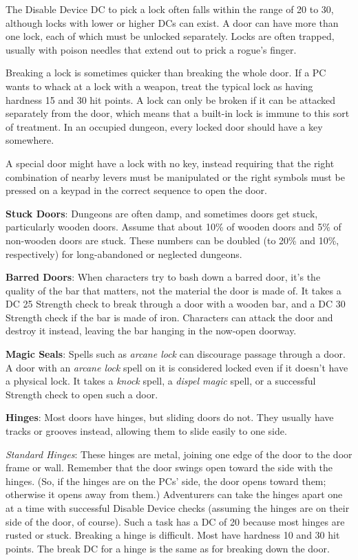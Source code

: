 The Disable Device DC to pick a lock often falls within the range of 20 to 30, although locks with lower or higher DCs can exist. A door can have more than one lock, each of which must be unlocked separately. Locks are often trapped, usually with poison needles that extend out to prick a rogue's finger.
				
Breaking a lock is sometimes quicker than breaking the whole door. If a PC wants to whack at a lock with a weapon, treat the typical lock as having hardness 15 and 30 hit points. A lock can only be broken if it can be attacked separately from the door, which means that a built-in lock is immune to this sort of treatment. In an occupied dungeon, every locked door should have a key somewhere. 
				
A special door might have a lock with no key, instead requiring that the right combination of nearby levers must be manipulated or the right symbols must be pressed on a keypad in the correct sequence to open the door.
				
\textbf{Stuck Doors}: Dungeons are often damp, and sometimes doors get stuck, particularly wooden doors. Assume that about 10\% of wooden doors and 5\% of non-wooden doors are stuck. These numbers can be doubled (to 20\% and 10\%, respectively) for long-abandoned or neglected dungeons.
				
\textbf{Barred Doors}: When characters try to bash down a barred door, it's the quality of the bar that matters, not the material the door is made of. It takes a DC 25 Strength check to break through a door with a wooden bar, and a DC 30 Strength check if the bar is made of iron. Characters can attack the door and destroy it instead, leaving the bar hanging in the now-open doorway.
				
\textbf{Magic Seals}: Spells such as \textit{arcane lock }can discourage passage through a door. A door with an \textit{arcane lock }spell on it is considered locked even if it doesn't have a physical lock. It takes a \textit{knock }spell, a \textit{dispel magic }spell, or a successful Strength check to open such a door.
				
\textbf{Hinges}: Most doors have hinges, but sliding doors do not. They usually have tracks or grooves instead, allowing them to slide easily to one side.
				
\textit{Standard Hinges}: These hinges are metal, joining one edge of the door to the door frame or wall. Remember that the door swings open toward the side with the hinges. (So, if the hinges are on the PCs' side, the door opens toward them; otherwise it opens away from them.) Adventurers can take the hinges apart one at a time with successful Disable Device checks (assuming the hinges are on their side of the door, of course). Such a task has a DC of 20 because most hinges are rusted or stuck. Breaking a hinge is difficult. Most have hardness 10 and 30 hit points. The break DC for a hinge is the same as for breaking down the door.
				
